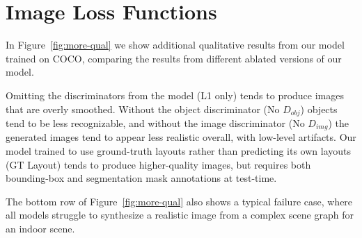 \documentclass[10pt,twocolumn,letterpaper]{article}
\begin{document}
\section{Image Loss Functions}
In Figure~\ref{fig:more-qual} we show additional qualitative results from our model trained
on COCO, comparing the results from different ablated versions of our model.

Omitting the discriminators from the model (L1 only) tends to produce images that are overly
smoothed. Without the object discriminator (No $D_{obj}$) objects tend to be less recognizable,
and without the image discriminator (No $D_{img}$) the generated images tend to appear less
realistic overall, with low-level artifacts. Our model trained to use ground-truth layouts
rather than predicting its own layouts (GT Layout) tends to produce higher-quality images,
but requires both bounding-box and segmentation mask annotations at test-time.

The bottom row of Figure~\ref{fig:more-qual} also shows a typical failure case,
where all models struggle to synthesize a realistic image from a complex scene graph for an
indoor scene.
\end{document}
